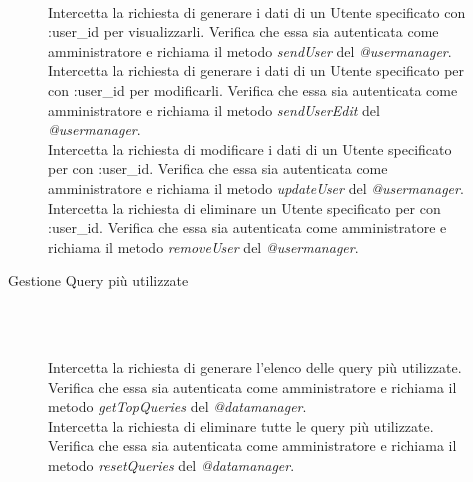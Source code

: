 \begin{description}
\begin{description}
\begin{mldescription}
	 \hfill \\
	Intercetta la richiesta di generare i dati di un Utente specificato con :user\_id per visualizzarli. Verifica che essa sia autenticata come amministratore e richiama il metodo \textit{sendUser} del \textit{@usermanager}.
     \hfill \\
    Intercetta la richiesta di generare i dati di un Utente specificato per con :user\_id per modificarli. Verifica che essa sia autenticata come amministratore e richiama il metodo \textit{sendUserEdit} del \textit{@usermanager}.
     \hfill \\
    Intercetta la richiesta di modificare i dati di un Utente specificato per con :user\_id. Verifica che essa sia autenticata come amministratore e richiama il metodo \textit{updateUser} del \textit{@usermanager}.
     \hfill \\
    Intercetta la richiesta di eliminare un Utente specificato per con :user\_id. Verifica che essa sia autenticata come amministratore e richiama il metodo \textit{removeUser} del \textit{@usermanager}.
  \end{mldescription}    
 \item[Gestione Query più utilizzate] \hfill \\
 \begin{mldescription}
     \hfill \\
    Intercetta la richiesta di generare l'elenco delle query più utilizzate. Verifica che essa sia autenticata come amministratore e richiama il metodo \textit{getTopQueries} del \textit{@datamanager}.
     \hfill \\
    Intercetta la richiesta di eliminare tutte le query più utilizzate. Verifica che essa sia autenticata come amministratore e richiama il metodo \textit{resetQueries} del \textit{@datamanager}.

\end{mldescription}
\end{description}
\end{description}
